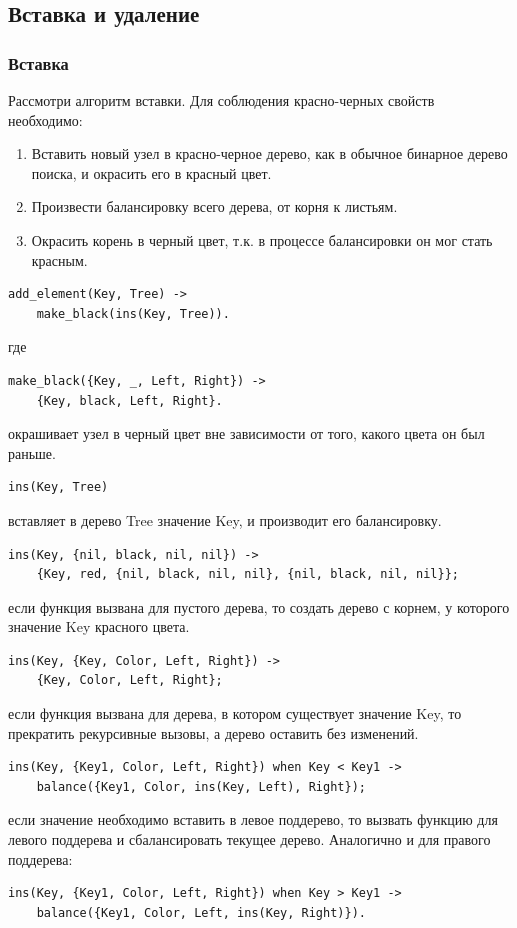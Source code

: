 	\subsection{Вставка и удаление}
		\subsubsection{Вставка}
			Рассмотри алгоритм вставки. Для соблюдения красно-черных свойств необходимо:
			\begin{enumerate}
				\item Вставить новый узел в красно-черное дерево, как в обычное бинарное 
					  дерево поиска, и окрасить его в красный цвет.
				\item Произвести балансировку всего дерева, от корня к листьям.
				\item Окрасить корень в черный цвет, т.к. в процессе балансировки он мог 
				      стать красным.
			\end{enumerate}

			\begin{lstlisting}
add_element(Key, Tree) ->
	make_black(ins(Key, Tree)).
			\end{lstlisting}
			где
			\begin{lstlisting}
make_black({Key, _, Left, Right}) ->
	{Key, black, Left, Right}.
			\end{lstlisting}
			окрашивает узел в черный цвет вне зависимости от того, какого цвета он был раньше.
	
			\begin{lstlisting}
ins(Key, Tree)
			\end{lstlisting}
			вставляет в дерево Tree значение Key, и производит его балансировку.
		
			\begin{lstlisting}
ins(Key, {nil, black, nil, nil}) ->
    {Key, red, {nil, black, nil, nil}, {nil, black, nil, nil}};
			\end{lstlisting} 
			если функция вызвана для пустого дерева, то создать дерево с корнем, у которого 
			значение Key красного цвета.
		
			\begin{lstlisting}
ins(Key, {Key, Color, Left, Right})	->
    {Key, Color, Left, Right};
			\end{lstlisting}
			если функция вызвана для дерева, в котором существует значение Key, то 
			прекратить рекурсивные вызовы, а дерево оставить без изменений.
			
			\begin{lstlisting}
ins(Key, {Key1, Color, Left, Right}) when Key < Key1 ->
	balance({Key1, Color, ins(Key, Left), Right});
			\end{lstlisting}
			если значение необходимо вставить в левое поддерево, то вызвать функцию для 
			левого поддерева и сбалансировать текущее дерево. Аналогично и для правого 
			поддерева:
			\begin{lstlisting}
ins(Key, {Key1, Color, Left, Right}) when Key > Key1 ->
	balance({Key1, Color, Left, ins(Key, Right)}).
			\end{lstlisting}
			
